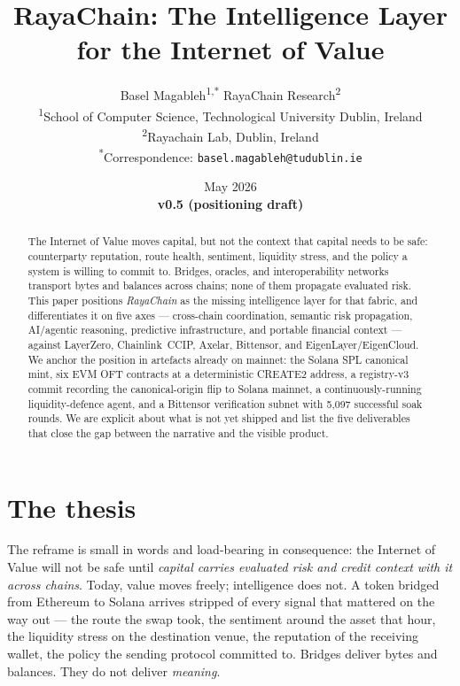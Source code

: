 \documentclass[11pt,a4paper]{article}
\title{RayaChain: The Intelligence Layer\\
       for the Internet of Value}
\author{%
  Basel Magableh\textsuperscript{1,*} \quad\quad RayaChain Research\textsuperscript{2} \\[0.8em]
  \normalsize\textsuperscript{1}School of Computer Science, Technological University Dublin, Ireland \\
  \normalsize\textsuperscript{2}Rayachain Lab, Dublin, Ireland \\[0.4em]
  \normalsize\textsuperscript{*}Correspondence: \texttt{basel.magableh@tudublin.ie}
}
\date{May 2026 \\ \textbf{v0.5 (positioning draft)}}
\begin{document}
\maketitle

\begin{abstract}
The Internet of Value moves capital, but not the context that capital
needs to be safe: counterparty reputation, route health, sentiment,
liquidity stress, and the policy a system is willing to commit to.
Bridges, oracles, and interoperability networks transport bytes and
balances across chains; none of them propagate evaluated risk. This
paper positions \emph{RayaChain} as the missing intelligence layer for
that fabric, and differentiates it on five axes ---
cross-chain coordination, semantic risk propagation, AI/agentic
reasoning, predictive infrastructure, and portable financial context ---
against LayerZero, Chainlink~CCIP, Axelar, Bittensor, and
EigenLayer/EigenCloud. We anchor the position in artefacts already on
mainnet: the Solana SPL canonical mint, six EVM OFT contracts at a
deterministic CREATE2 address, a registry-v3 commit recording the
canonical-origin flip to Solana mainnet, a continuously-running
liquidity-defence agent, and a Bittensor verification subnet with
5{,}097 successful soak rounds. We are explicit about what is not yet
shipped and list the five deliverables that close the gap between the
narrative and the visible product.
\end{abstract}

\section*{The thesis}
\label{sec:thesis}

The reframe is small in words and load-bearing in consequence: the
Internet of Value will not be safe until \emph{capital carries
evaluated risk and credit context with it across chains}. Today, value
moves freely; intelligence does not. A token bridged from Ethereum to
Solana arrives stripped of every signal that mattered on the way out
--- the route the swap took, the sentiment around the asset that
hour, the liquidity stress on the destination venue, the reputation of
the receiving wallet, the policy the sending protocol committed to.
Bridges deliver bytes and balances. They do not deliver \emph{meaning}.
\end{document}
